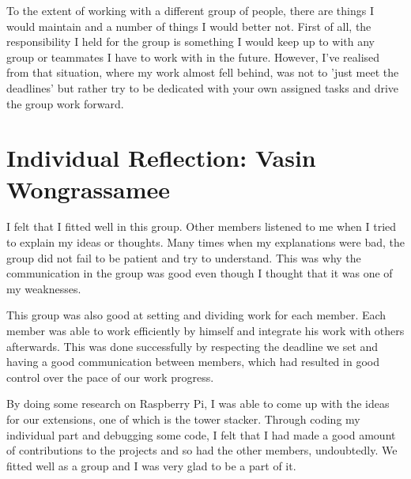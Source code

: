 \documentclass[11pt]{article}
\begin{document}
\medskip

To the extent of working with a different group of people, there are things I would maintain and a number of things I would better not. First of all, the responsibility I held for the group is something I would keep up to with any group or teammates I have to work with in the future. However, I've realised from that situation, where my work almost fell behind, was not to 'just meet the deadlines' but rather try to be dedicated with your own assigned tasks and drive the group work forward. 

\section{Individual Reflection: Vasin Wongrassamee}

I felt that I fitted well in this group. Other members listened to me when I tried to explain my ideas or thoughts. Many times when my explanations were bad, the group did not fail to be patient and try to understand. This was why the communication in the group was good even though I thought that it was one of my weaknesses.

\medskip

This group was also good at setting and dividing work for each member. Each member was able to work efficiently by himself and integrate his work with others afterwards. This was done successfully by respecting the deadline we set and having a good communication between members, which had resulted in good control over the pace of our work progress.

\medskip

By doing some research on Raspberry Pi, I was able to come up with the ideas for our extensions, one of which is the tower stacker. Through coding my individual part and debugging some code, I felt that I had made a good amount of contributions to the projects and so had the other members, undoubtedly. We fitted well as a group and I was very glad to be a part of it.
\end{document}
